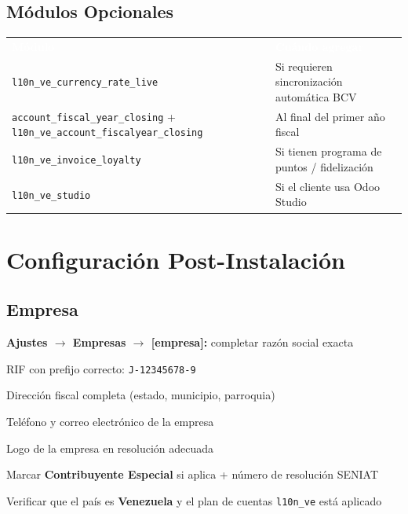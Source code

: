 \documentclass[11pt,a4paper]{article}
\newcommand{\modulo}[1]{\texttt{\textcolor{naranja}{#1}}}
\newcommand{\tchead}[1]{%
  \cellcolor{naranja}\textcolor{white}{\textbf{#1}}%
}
\begin{document}
\begin{Form}
\vspace{12pt}

\subsection{Módulos Opcionales}

\begin{center}
\begin{tabular}{L{6.5cm} L{7.5cm}}
  \tchead{Módulo} & \tchead{Cuándo agregar} \\
  \modulo{l10n\_ve\_currency\_rate\_live} & Si requieren sincronización automática BCV \\
  \modulo{account\_fiscal\_year\_closing} + \modulo{l10n\_ve\_account\_fiscalyear\_closing} & Al final del primer año fiscal \\
  \modulo{l10n\_ve\_invoice\_loyalty} & Si tienen programa de puntos / fidelización \\
  \modulo{l10n\_ve\_studio} & Si el cliente usa Odoo Studio \\
\end{tabular}
\end{center}

\clearpage

\section{Configuración Post-Instalación}

\subsection{Empresa}

\begin{checklist}
  \item \textbf{Ajustes $\rightarrow$ Empresas $\rightarrow$ [empresa]:} completar razón social exacta
  \item RIF con prefijo correcto: \texttt{J-12345678-9}
  \item Dirección fiscal completa (estado, municipio, parroquia)
  \item Teléfono y correo electrónico de la empresa
  \item Logo de la empresa en resolución adecuada
  \item Marcar \textbf{Contribuyente Especial} si aplica + número de resolución SENIAT
  \item Verificar que el país es \textbf{Venezuela} y el plan de cuentas \modulo{l10n\_ve} está aplicado
\end{checklist}


\end{Form}
\end{document}
